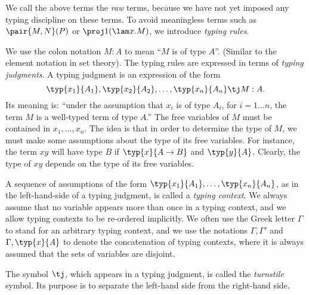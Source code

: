 \documentclass[12pt]{article}
\begin{document}
We call the above terms the {\em raw} terms, because we have not yet
imposed any typing discipline on these terms. To avoid meaningless
terms such as $\pair{M,N}(P)$ or $\proj1(\lam x.M)$, we introduce {\em
  typing rules}. 

We use the colon notation $M:A$ to mean ``$M$ is of type $A$''.
(Similar to the element notation in set theory).  The typing rules are
expressed in terms of {\em typing judgments}. A typing judgment is an
expression of the form
\[  \typ{x_1}{A_1},\typ{x_2}{A_2},\ldots,\typ{x_n}{A_n} \tj M:A.
\]
Its meaning is: ``under the assumption that $x_i$ is of type $A_i$,
for $i=1\ldots n$, the term $M$ is a well-typed term of type $A$.'' 
The free variables of $M$ must be contained in $x_1,\ldots,x_n$. The
idea is that in order to determine the type of $M$, we must make some
assumptions about the type of its free variables. For instance, the
term $xy$ will have type $B$ if $\typ{x}{A\to B}$ and $\typ{y}{A}$. 
Clearly, the type of $xy$ depends on the type of its free variables. 

A sequence of assumptions of the form
$\typ{x_1}{A_1},\ldots,\typ{x_n}{A_n}$, as in the left-hand-side of a
typing judgment, is called a {\em typing context}. We always assume
that no variable appears more than once in a typing context, and we
allow typing contexts to be re-ordered implicitly. We often use the
Greek letter $\Gamma$ to stand for an arbitrary typing context, and we
use the notations $\Gamma,\Gamma'$ and $\Gamma,\typ{x}{A}$ to denote
the concatenation of typing contexts, where it is always assumed that
the sets of variables are disjoint.

The symbol $\tj$, which appears in a typing judgment, is called the
{\em turnstile} symbol. Its purpose is to separate the left-hand side
from the right-hand side. 
\end{document}
